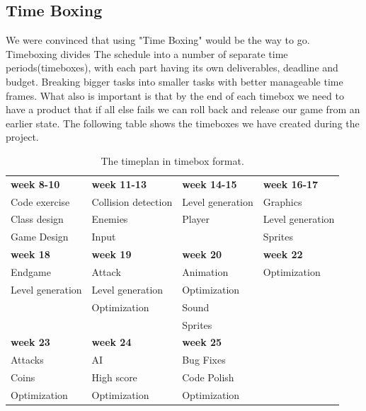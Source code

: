 \subsection*{Time Boxing} %
We were convinced that using "Time Boxing" would be the way to go. Timeboxing divides The schedule into a number of separate time periods(timeboxes), with each part having its own deliverables, deadline and budget. Breaking bigger tasks into smaller tasks with better manageable time frames. What also is important is that by the end of each timebox we need to have a product that if all else fails we can roll back and release our game from an earlier state. The following table shows the timeboxes we have created during the project.
\begin{table}[h]
\begin{tabular}{llll}
  \rowcolor[HTML]{BBDAFF}
  \textbf{week 8-10}	& \textbf{week 11-13}	& \textbf{week 14-15}	& \textbf{week 16-17}	\\
  Code exercise			& Collision detection	& Level generation		& Graphics				\\
  Class design			& Enemies				& Player				& Level generation		\\
  Game Design			& Input					& 						& Sprites				\\
  \rowcolor[HTML]{BBDAFF} 
  \textbf{week 18}		& \textbf{week 19}		& \textbf{week 20}		& \textbf{week 22}		\\
  Endgame				& Attack				& Animation				& Optimization			\\
  Level generation		& Level generation		& Optimization			& 						\\
  						& Optimization			& Sound					& 						\\
  						& 						& Sprites 				& 						\\
  \rowcolor[HTML]{BBDAFF}
  \textbf{week 23}		& \textbf{week 24}		& \textbf{week 25}		& 						\\
  Attacks				& AI					& Bug Fixes				& 						\\
  Coins					& High score			& Code Polish			& 						\\
  Optimization			& Optimization			& Optimization			& 						\\
\end{tabular}
\caption{The timeplan in timebox format.}
\end{table}

